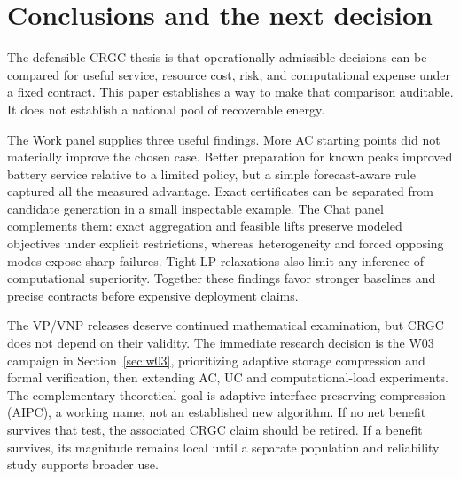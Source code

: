 \documentclass[11pt,letterpaper]{article}
\begin{document}
\section{Conclusions and the next decision}
The defensible CRGC thesis is that operationally admissible decisions can be compared for useful service, resource cost, risk, and computational expense under a fixed contract. This paper establishes a way to make that comparison auditable. It does not establish a national pool of recoverable energy.

The Work panel supplies three useful findings. More AC starting points did not materially improve the chosen case. Better preparation for known peaks improved battery service relative to a limited policy, but a simple forecast-aware rule captured all the measured advantage. Exact certificates can be separated from candidate generation in a small inspectable example. The Chat panel complements them: exact aggregation and feasible lifts preserve modeled objectives under explicit restrictions, whereas heterogeneity and forced opposing modes expose sharp failures. Tight LP relaxations also limit any inference of computational superiority. Together these findings favor stronger baselines and precise contracts before expensive deployment claims.

The VP/VNP releases deserve continued mathematical examination, but CRGC does not depend on their validity. The immediate research decision is the W03 campaign in Section~\ref{sec:w03}, prioritizing adaptive storage compression and formal verification, then extending AC, UC and computational-load experiments. The complementary theoretical goal is adaptive interface-preserving compression (AIPC), a working name, not an established new algorithm. If no net benefit survives that test, the associated CRGC claim should be retired. If a benefit survives, its magnitude remains local until a separate population and reliability study supports broader use.


\clearpage
\appendix
\end{document}
